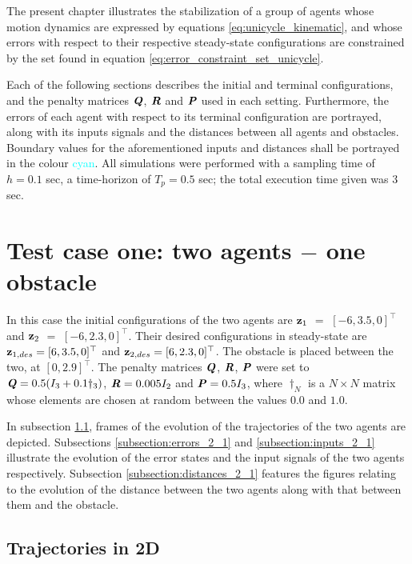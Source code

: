 The present chapter illustrates the stabilization of a group of agents whose
motion dynamics are expressed by equations \eqref{eq:unicycle_kinematic}, and
whose errors with respect to their respective steady-state configurations are
constrained by the set found in equation \eqref{eq:error_constraint_set_unicycle}.

Each of the following sections describes the initial and terminal configurations,
and the penalty matrices $\bm{\mathit{Q}}$, $\bm{\mathit{R}}$ and $\bm{\mathit{P}}$ used in each setting.
Furthermore, the errors of each agent with respect to its terminal configuration
are portrayed, along with its inputs signals and the distances between all
agents and obstacles. Boundary values for the aforementioned inputs and
distances shall be portrayed in the colour \textcolor{cyan}{cyan}.
All simulations were performed with a sampling time of $h = 0.1$ sec,
a time-horizon of $T_p = 0.5$ sec; the total execution time given was $3$ sec.


\section{Test case one: two agents $-$ one obstacle}

In this case the initial configurations of the two agents are
$\bm{\mathbf{z}}_1$ $=$ $[-6, 3.5, 0]^{\top}$ and
$\bm{\mathbf{z}}_2$ $=$ $[-6, 2.3, 0]^{\top}$.
Their desired configurations in steady-state are
$\bm{\mathbf{z}}_{1,des} = [6, 3.5, 0]^{\top}$ and
$\bm{\mathbf{z}}_{2,des} = [6, 2.3, 0]^{\top}$.
The obstacle is placed between the two, at $[0, 2.9]^{\top}$. The penalty
matrices $\bm{\mathit{Q}}$, $\bm{\mathit{R}}$, $\bm{\mathit{P}}$ were set to
$\bm{\mathit{Q}} = 0.5 (I_3 + 0.1 \dagger_3)$, $\bm{\mathit{R}} = 0.005 I_2$ and
$\bm{\mathit{P}} = 0.5 I_3$, where $\dagger_N$ is a $N \times N$ matrix whose
elements are chosen at random between the values $0.0$ and $1.0$.

In subsection \ref{subsection:trajectories_2_1}, frames of the evolution of the
trajectories of the two agents are depicted. Subsections
\ref{subsection:errors_2_1} and \ref{subsection:inputs_2_1} illustrate
the evolution of the error states and the input signals of the two agents
respectively. Subsection \ref{subsection:distances_2_1} features the
figures relating to the evolution of the distance between the two agents
along with that between them and the obstacle.



\subsection{Trajectories in 2D}
\label{subsection:trajectories_2_1}

